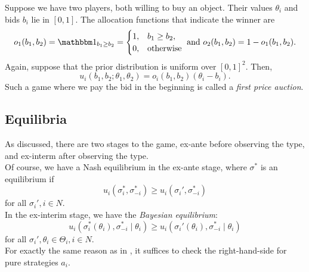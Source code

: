 	\begin{fex}
		\label{ex: sealed bid auction}
		Suppose we have two players, both willing to buy an object. Their values $\theta_i$ and bids $b_i$ lie in $[0,1]$. The allocation functions that indicate the winner are
		\[ o_1(b_1,b_2) = \indic_{b_1 \ge b_2} = \begin{cases} 1, & b_1 \ge b_2, \\ 0, & \text{otherwise} \end{cases} \text{ and } o_2(b_1,b_2) = 1 - o_1(b_1,b_2). \]
		Again, suppose that the prior distribution is uniform over $[0,1]^2$. Then,
		\[ u_i(b_1,b_2;\theta_1,\theta_2) = o_i(b_1,b_2)(\theta_i - b_i). \]
		Such a game where we pay the bid in the beginning is called a \emph{first price auction}.
	\end{fex}

\subsection{Equilibria}

	As discussed, there are two stages to the game, ex-ante before observing the type, and ex-interm after observing the type.\\
	Of course, we have a Nash equilibrium in the ex-ante stage, where $\sigma^*$ is an equilibrium if
	\[ u_i(\sigma_i^*,\sigma_{-i}^*) \ge u_i(\sigma_i',\sigma_{-i}^*) \]
	for all $\sigma_i',i \in N$.\\
	In the ex-interim stage, we have the \emph{Bayesian equilibrium}:
	\[ u_i(\sigma_i^*(\theta_i) , \sigma_{-i}^* \mid \theta_i) \ge u_i(\sigma_i'(\theta_i),\sigma_{-i}^* \mid \theta_i) \]
	for all $\sigma_i',\theta_i \in \Theta_i, i \in N$.\\

	For exactly the same reason as in , it suffices to check the right-hand-side for pure strategies $a_i$.


